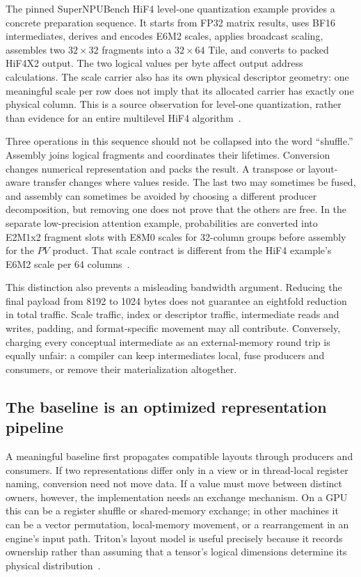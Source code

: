 The pinned SuperNPUBench HiF4 level-one quantization example provides a concrete preparation sequence. It starts from FP32 matrix results, uses BF16 intermediates, derives and encodes E6M2 scales, applies broadcast scaling, assembles two $32\times32$ fragments into a $32\times64$ Tile, and converts to packed HiF4X2 output. The two logical values per byte affect output address calculations. The scale carrier also has its own physical descriptor geometry: one meaningful scale per row does not imply that its allocated carrier has exactly one physical column. This is a source observation for level-one quantization, rather than evidence for an entire multilevel HiF4 algorithm~\citep{u003_hif4_bench}.

Three operations in this sequence should not be collapsed into the word ``shuffle.'' Assembly joins logical fragments and coordinates their lifetimes. Conversion changes numerical representation and packs the result. A transpose or layout-aware transfer changes where values reside. The last two may sometimes be fused, and assembly can sometimes be avoided by choosing a different producer decomposition, but removing one does not prove that the others are free. In the separate low-precision attention example, probabilities are converted into E2M1x2 fragment slots with E8M0 scales for 32-column groups before assembly for the $PV$ product. That scale contract is different from the HiF4 example's E6M2 scale per 64 columns~\citep{u003_lowp_attention}.

This distinction also prevents a misleading bandwidth argument. Reducing the final payload from 8192 to 1024 bytes does not guarantee an eightfold reduction in total traffic. Scale traffic, index or descriptor traffic, intermediate reads and writes, padding, and format-specific movement may all contribute. Conversely, charging every conceptual intermediate as an external-memory round trip is equally unfair: a compiler can keep intermediates local, fuse producers and consumers, or remove their materialization altogether.

\subsection{The baseline is an optimized representation pipeline}

A meaningful baseline first propagates compatible layouts through producers and consumers. If two representations differ only in a view or in thread-local register naming, conversion need not move data. If a value must move between distinct owners, however, the implementation needs an exchange mechanism. On a GPU this can be a register shuffle or shared-memory exchange; in other machines it can be a vector permutation, local-memory movement, or a rearrangement in an engine's input path. Triton's layout model is useful precisely because it records ownership rather than assuming that a tensor's logical dimensions determine its physical distribution~\citep{u003_triton_layouts}.

